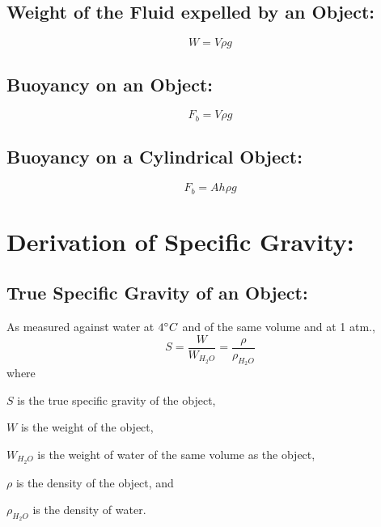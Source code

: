 \documentclass[a4paper]{report}
\begin{document}
        \subsection{Weight of the Fluid expelled by an Object: }
            \begin{equation}
                W = V \rho g
            \end{equation}
        \subsection{Buoyancy on an Object: }
            \begin{equation}
                F_b = V \rho g
            \end{equation}
        \subsection{Buoyancy on a Cylindrical Object: }
            \begin{equation}
                F_b = Ah \rho g
            \end{equation}
    \section{Derivation of Specific Gravity: }
        \subsection{True Specific Gravity of an Object: }
            As measured against water at $4 \degree C$ and of the same volume and at 1 atm.,
            \begin{equation}
                S = \frac{W}{W_{H_2 O}} = \frac{\rho}{\rho_{H_2 O}}
            \end{equation}
            where
            \begin{description}
                \item $S$ is the true specific gravity of the object,
                \item $W$ is the weight of the object,
                \item $W_{H_2 O}$ is the weight of water of the same volume as the object,
                \item $\rho$ is the density of the object, and
                \item $\rho_{H_2 O}$ is the density of water.
            \end{description}
\end{document}
